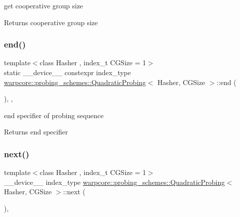 get cooperative group size 

\begin{DoxyReturn}{Returns}
cooperative group size 
\end{DoxyReturn}
\mbox{\label{classwarpcore_1_1probing__schemes_1_1QuadraticProbing_aa1eabb3eed4c1f2400fee8d7b487267e}} 
\subsubsection{\texorpdfstring{end()}{end()}}
{\footnotesize\ttfamily template$<$class Hasher , index\+\_\+t C\+G\+Size = 1$>$ \\
static \+\_\+\+\_\+device\+\_\+\+\_\+ constexpr index\+\_\+type \hyperlink{classwarpcore_1_1probing__schemes_1_1QuadraticProbing}{warpcore\+::probing\+\_\+schemes\+::\+Quadratic\+Probing}$<$ Hasher, C\+G\+Size $>$\+::end (\begin{DoxyParamCaption}{ }\end{DoxyParamCaption})\hspace{0.3cm}{\ttfamily [inline]}, {\ttfamily [static]}, {\ttfamily [noexcept]}}



end specifier of probing sequence 

\begin{DoxyReturn}{Returns}
end specifier 
\end{DoxyReturn}
\mbox{\label{classwarpcore_1_1probing__schemes_1_1QuadraticProbing_ad19ec9917173a2e4a1381f8848a367b8}} 
\subsubsection{\texorpdfstring{next()}{next()}}
{\footnotesize\ttfamily template$<$class Hasher , index\+\_\+t C\+G\+Size = 1$>$ \\
\+\_\+\+\_\+device\+\_\+\+\_\+ index\+\_\+type \hyperlink{classwarpcore_1_1probing__schemes_1_1QuadraticProbing}{warpcore\+::probing\+\_\+schemes\+::\+Quadratic\+Probing}$<$ Hasher, C\+G\+Size $>$\+::next (\begin{DoxyParamCaption}{ }\end{DoxyParamCaption})\hspace{0.3cm}{\ttfamily [inline]}, {\ttfamily [noexcept]}}



